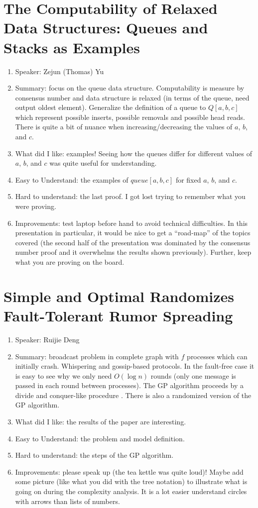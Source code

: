 \documentclass[twoside]{article}
\begin{document}
\section{The Computability of Relaxed Data Structures: Queues and Stacks as Examples}
\begin{enumerate}
\item Speaker: Zejun (Thomas) Yu
\item Summary: focus on the queue data structure. Computability is measure by consensus number and data structure is relaxed (in terms of the queue, need output oldest element). Generalize the definition of a queue to $Q[a,b,c]$ which represent possible inserts, possible removals and possible head reads. There is quite a bit of nuance when increasing/decreasing the values of $a$, $b$, and $c$. 
\item What did I like: examples! Seeing how the queues differ for different values of $a$, $b$, and $c$ was quite useful for understanding.
\item Easy to Understand: the examples of $queue[a,b,c]$ for fixed $a$, $b$, and $c$. 
\item Hard to understand: the last proof. I got lost trying to remember what you were proving. 
\item Improvements: test laptop before hand to avoid technical difficulties. In this presentation in particular, it would be nice to get a ``road-map'' of the topics covered (the second half of the presentation was dominated by the consensus number proof and it overwhelms the results shown previously). Further, keep what you are proving on the board.
\end{enumerate}

\section{Simple and Optimal Randomizes Fault-Tolerant Rumor Spreading}
\begin{enumerate}
\item Speaker: Ruijie Deng
\item Summary: broadcast problem in complete graph with $f$ processes which can initially crash. Whispering and gossip-based protocols. In the fault-free case it is easy to see why we only need $O(\log n)$ rounds (only one message is passed in  each round between processes). The GP algorithm proceeds by a divide and conquer-like procedure . There is also a randomized version of the GP algorithm.  
\item What did I like: the results of the paper are interesting. 
\item Easy to Understand: the problem and model definition.
\item Hard to understand: the steps of the GP algorithm. 
\item Improvements: please speak up (the tea kettle was quite loud)! Maybe add some picture (like what you did with the tree notation) to illustrate what is going on during the complexity analysis. It is a lot easier understand circles with arrows than lists of numbers. 
\end{enumerate}
\end{document}
